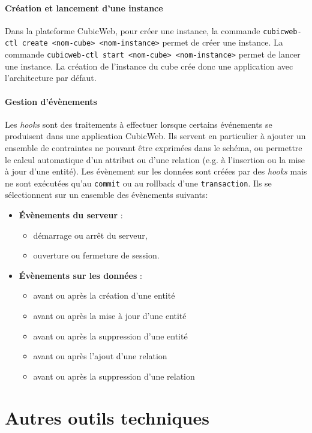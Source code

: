 \documentclass {report}
\begin{document}
\paragraph{Création et lancement d'une instance}
Dans la plateforme CubicWeb, pour créer une instance, la commande \verb+cubicweb-ctl create <nom-cube> <nom-instance>+ permet de créer une instance. La commande \verb+cubicweb-ctl start <nom-cube> <nom-instance>+ permet de lancer une instance. La création de l'instance du cube crée donc une application avec l'architecture par défaut.

\paragraph{Gestion d'évènements}
Les \textit{hooks} sont des traitements à effectuer lorsque certains événements se produisent dans une application CubicWeb. Ils servent en particulier à ajouter un ensemble de contraintes ne pouvant
être exprimées dans le schéma, ou permettre le calcul automatique d’un attribut ou d’une relation (e.g. à l’insertion ou la mise à jour d’une entité). Les évènement sur les données sont créées par des \textit{hooks} mais ne sont exécutées qu'au \verb+commit+ ou au rollback d'une \verb+transaction+. Ils se sélectionnent sur un ensemble des évènements suivants:
\begin{itemize}
\item \textbf{Évènements du serveur} :
    \begin{itemize}
    \item démarrage ou arrêt du serveur,
    \item ouverture ou fermeture de session.
    \end{itemize}
\item \textbf{Évènements sur les données} :
    \begin{itemize}
    \item avant ou après la création d’une entité
    \item avant ou après la mise à jour d’une entité
    \item avant ou après la suppression d’une entité
    \item avant ou après l’ajout d'une relation
    \item avant ou après la suppression d’une relation 
    \end{itemize}
\end{itemize}




\section{Autres outils techniques}
\end{document}

